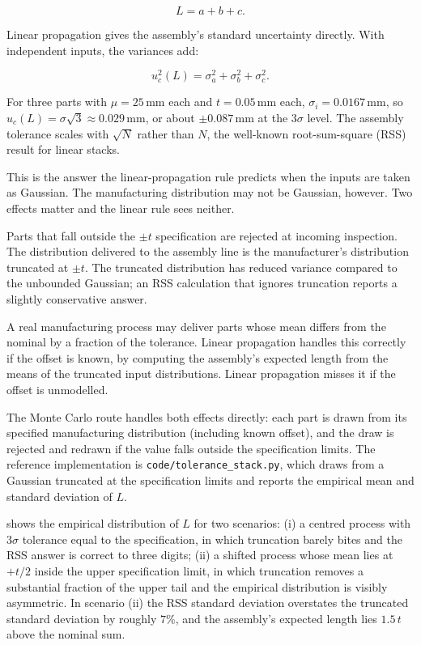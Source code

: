 \[
L = a + b + c.
\]

Linear propagation gives the assembly's standard uncertainty
directly. With independent inputs, the variances add:

\[
u_{c}^{2}(L) = \sigma_{a}^{2} + \sigma_{b}^{2} + \sigma_{c}^{2}.
\]

For three parts with $\mu = 25\,\si{\milli\meter}$ each and
$t = 0.05\,\si{\milli\meter}$ each, $\sigma_{i} = 0.0167\,
\si{\milli\meter}$, so $u_{c}(L) = \sigma\sqrt{3} \approx 0.029
\,\si{\milli\meter}$, or about $\pm 0.087\,\si{\milli\meter}$ at
the $3\sigma$ level. The assembly tolerance scales with $\sqrt{N}$
rather than $N$, the well-known root-sum-square (RSS) result for
linear stacks.

This is the answer the linear-propagation rule predicts when the
inputs are taken as Gaussian. The manufacturing distribution may
not be Gaussian, however. Two effects matter and the linear rule
sees neither.

 Parts that fall
outside the $\pm t$ specification are rejected at incoming
inspection. The distribution delivered to the assembly line is the
manufacturer's distribution truncated at $\pm t$. The truncated
distribution has reduced variance compared to the unbounded
Gaussian; an RSS calculation that ignores truncation reports a
slightly conservative answer.

 A real manufacturing process may
deliver parts whose mean differs from the nominal by a fraction of
the tolerance. Linear propagation handles this correctly if the
offset is known, by computing the assembly's expected length from
the means of the truncated input distributions. Linear propagation
misses it if the offset is unmodelled.

The Monte Carlo route handles both effects directly: each part is
drawn from its specified manufacturing distribution (including
known offset), and the draw is rejected and redrawn if the value
falls outside the specification limits. The reference
implementation is \texttt{code/tolerance\_stack.py}, which draws
from a Gaussian truncated at the specification limits and reports
the empirical mean and standard deviation of $L$.



 shows the empirical
distribution of $L$ for two scenarios: (i) a centred process with
$3\sigma$ tolerance equal to the specification, in which truncation
barely bites and the RSS answer is correct to three digits; (ii) a
shifted process whose mean lies at $+t/2$ inside the upper
specification limit, in which truncation removes a substantial
fraction of the upper tail and the empirical distribution is
visibly asymmetric. In scenario (ii) the RSS standard deviation
overstates the truncated standard deviation by roughly $7\%$, and
the assembly's expected length lies $1.5\,t$ above the nominal sum.

